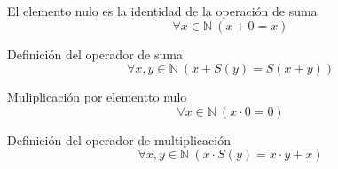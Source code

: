 \begin{axiom} \label{nat_sumz} El elemento nulo es la identidad de la operación de suma
	\begin{equation}
		\forall x  \in \mathbb{N}\ (x+0=x)
	\end{equation}
\end{axiom}
\begin{axiom} \label{nat_sumnz} Definición del operador de suma
	\begin{equation}
		\forall x,y  \in \mathbb{N}\ (x+S(y)=S(x+y))
	\end{equation}
\end{axiom}
\begin{axiom} \label{nat_mulz} Muliplicación por elementto nulo
	\begin{equation}
		\forall x  \in \mathbb{N}\ (x\cdot 0=0)
	\end{equation}
\end{axiom}
\begin{axiom} \label{nat_mulnz} Definición del operador de multiplicación
	\begin{equation}
		\forall x,y  \in \mathbb{N}\ (x\cdot S(y)=x\cdot y+x)
	\end{equation}
\end{axiom}
